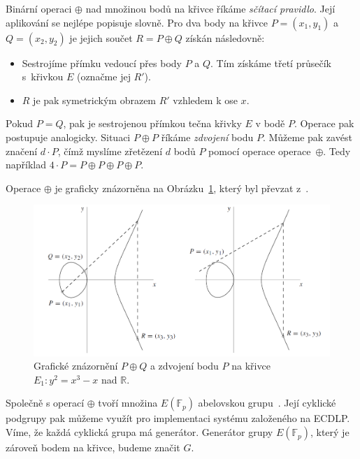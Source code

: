\documentclass[
  program=infoi,
  biblatex=false,
  figures=true,
  glossaries,
  tables=false,
  sourcecodes=true,
  index
]{kidiplom}
\begin{document}
    Binární operaci $\oplus$ nad množinou bodů na křivce říkáme \emph{sčítací pravidlo}.
    Její aplikování se nejlépe popisuje slovně.
    Pro dva body na křivce $P = (x_1,y_1)$ a~$Q = (x_2, y_2)$
    je jejich součet $R = P \oplus Q$ získán následovně:
    
    \begin{itemize}
        \item 
            Sestrojíme přímku vedoucí přes body $P$ a $Q$. Tím získáme třetí průsečík s~křivkou $E$ (označme jej $R'$).
        \item
            $R$ je pak symetrickým obrazem $R'$ vzhledem k ose $x$.
    \end{itemize}

    \begin{remark}
        Pokud $P = Q$, pak je sestrojenou přímkou tečna křivky $E$ v bodě $P$. Operace pak postupuje analogicky.
        Situaci $P \oplus P$ říkáme \emph{zdvojení} bodu $P$.
        Můžeme pak zavést značení $d \cdot P$, čímž myslíme zřetězení $d$ bodů $P$ pomocí operace operace~$\oplus$.
        Tedy například $4 \cdot P = P \oplus P \oplus P \oplus P$.
    \end{remark}

    Operace $\oplus$ je graficky znázorněna na Obrázku~\ref{fig:ec-addition-rule}, který byl převzat z~\cite{guide-elliptic-curve}.

    \begin{figure}
        \centering
        \includegraphics[width=\textwidth]{ec_addition_rule}
        \caption{Grafické znázornění $P \oplus Q$ a zdvojení bodu $P$ na křivce $E_1:y^2 = x^3 - x$ nad $\mathbb{R}$.}\label{fig:ec-addition-rule}
    \end{figure}

    Společně s operací $\oplus$ tvoří množina $E(\mathbb{F}_p)$ abelovskou grupu~\cite{guide-elliptic-curve}.
    Její cyklické podgrupy pak můžeme využít pro implementaci systému založeného na ECDLP.
    Víme, že každá cyklická grupa má generátor.
    Generátor grupy $E(\mathbb{F}_p)$, který je zároveň bodem na křivce, budeme značit $G$.
\end{document}
